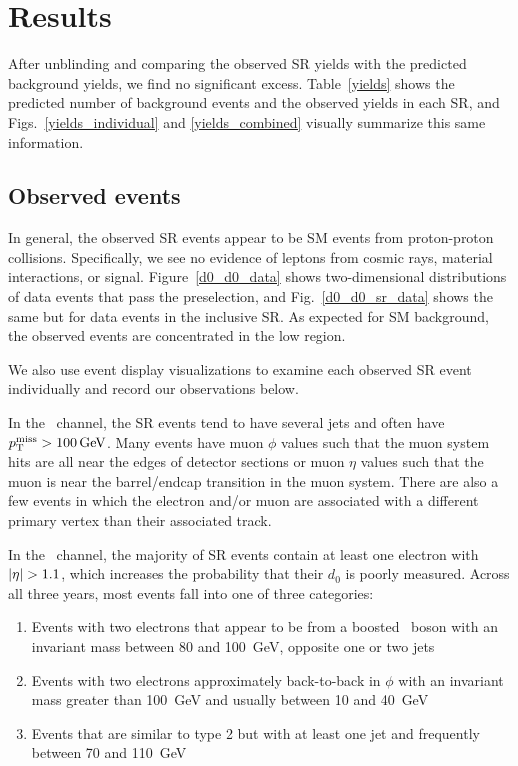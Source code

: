 \section{Results}
\label{results}
After unblinding and comparing the observed SR yields with the predicted background yields, we find no significant excess. Table~\ref{yields} shows the predicted number of background events and the observed yields in each SR, and Figs.~\ref{yields_individual} and \ref{yields_combined} visually summarize this same information. 




\subsection{Observed events}
In general, the observed SR events appear to be SM events from proton-proton collisions. Specifically, we see no evidence of leptons from cosmic rays, material interactions, or signal.  Figure~\ref{d0_d0_data} shows two-dimensional \ad distributions of data events that pass the preselection, and Fig.~\ref{d0_d0_sr_data} shows the same but for data events in the inclusive SR. As expected for SM background, the observed events are concentrated in the low \ad region.



We also use event display visualizations to examine each observed SR event individually and record our observations below.

In the \Pe\Pgm\ channel, the SR events tend to have several jets and often have $\ptmiss>\SI{100}{\GeV}$. Many events have muon $\phi$ values such that the muon system hits are all near the edges of detector sections or muon $\eta$ values such that the muon is near the barrel/endcap transition in the muon system. There are also a few events in which the electron and/or muon are associated with a different primary vertex than their associated track.

In the \Pe\Pe\ channel, the majority of SR events contain at least one electron with $\lvert \eta \rvert > 1.1$, which increases the probability that their $d_0$ is poorly measured. Across all three years, most events fall into one of three categories: 
\begin{enumerate}
    \itemsep0em
    \item Events with two electrons that appear to be from a boosted \cPZ\ boson with an invariant mass between \num{80} and \SI{100}{\GeV}, opposite one or two jets
    \item Events with two electrons approximately back-to-back in $\phi$ with an invariant mass greater than \SI{100}{\GeV} and \ptmiss usually between \num{10} and \SI{40}{\GeV}
    \item Events that are similar to type 2 but with at least one jet and frequently \ptmiss between \num{70} and \SI{110}{\GeV}
\end{enumerate}

